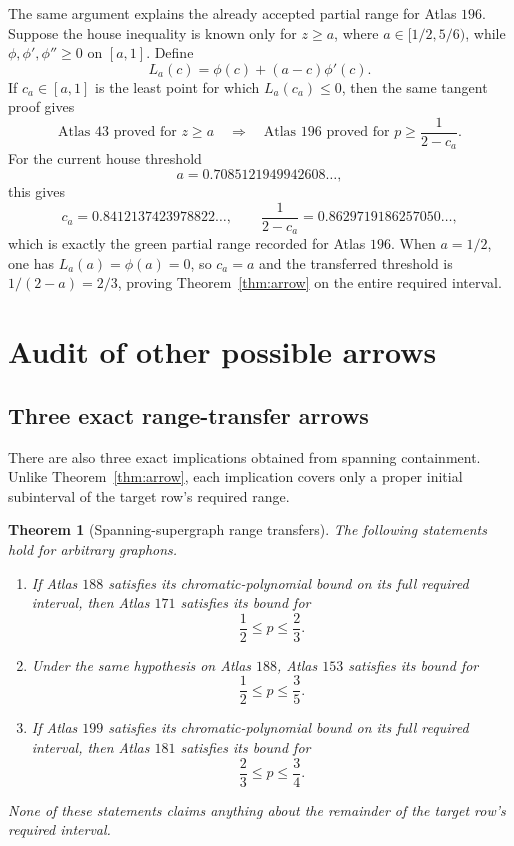 \documentclass[11pt]{article}
\newtheorem{theorem}{Theorem}
\begin{document}
The same argument explains the already accepted partial range for Atlas
$196$.  Suppose the house inequality is known only for $z\geq a$, where
$a\in[1/2,5/6)$, while $\phi,\phi',\phi''\geq0$ on $[a,1]$.  Define
\[
 L_a(c)=\phi(c)+(a-c)\phi'(c).
\]
If $c_a\in[a,1]$ is the least point for which $L_a(c_a)\leq0$, then the
same tangent proof gives
\[
 \boxed{
  \text{Atlas }43\text{ proved for }z\geq a
  \quad\Longrightarrow\quad
  \text{Atlas }196\text{ proved for }
  p\geq\frac1{2-c_a}.}
\]
For the current house threshold
\[
 a=0.7085121949942608\ldots,
\]
this gives
\[
 c_a=0.8412137423978822\ldots,
 \qquad
 \frac1{2-c_a}=0.8629719186257050\ldots,
\]
which is exactly the green partial range recorded for Atlas $196$.
When $a=1/2$, one has $L_a(a)=\phi(a)=0$, so $c_a=a$ and the transferred
threshold is $1/(2-a)=2/3$, proving Theorem~\ref{thm:arrow} on the entire
required interval.

\section{Audit of other possible arrows}

\subsection{Three exact range-transfer arrows}

There are also three exact implications obtained from spanning containment.
Unlike Theorem~\ref{thm:arrow}, each implication covers only a proper initial
subinterval of the target row's required range.

\begin{theorem}[Spanning-supergraph range transfers]
\label{thm:range-arrows}
The following statements hold for arbitrary graphons.
\begin{enumerate}
\item If Atlas $188$ satisfies its chromatic-polynomial bound on its full
required interval, then Atlas $171$ satisfies its bound for
\[
 \frac12\leq p\leq\frac23.
\]
\item Under the same hypothesis on Atlas $188$, Atlas $153$ satisfies its
bound for
\[
 \frac12\leq p\leq\frac35.
\]
\item If Atlas $199$ satisfies its chromatic-polynomial bound on its full
required interval, then Atlas $181$ satisfies its bound for
\[
 \frac23\leq p\leq\frac34.
\]
\end{enumerate}
None of these statements claims anything about the remainder of the target row's
required interval.
\end{theorem}
\end{document}
